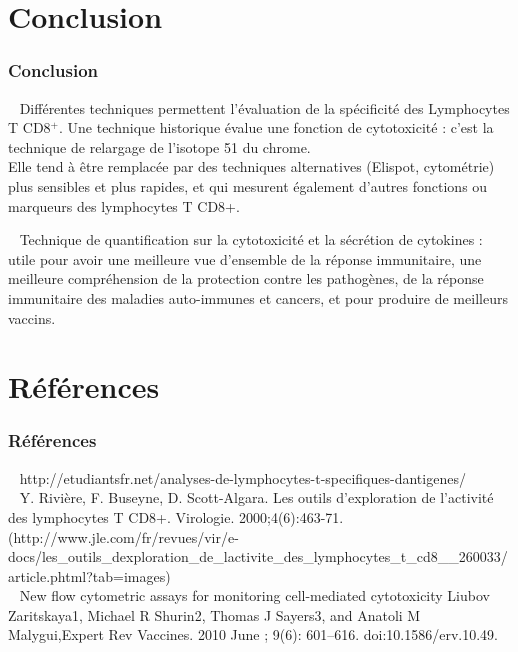 \documentclass[12pt]{beamer}
\begin{document}
\section{Conclusion}

\begin{frame}
  \transuncover
  \frametitle{Conclusion}

	\textbullet~ Différentes techniques permettent l'évaluation de la spécificité des Lymphocytes T CD8$^+$. Une technique historique évalue une fonction de cytotoxicité : c'est la technique de relargage de l’isotope 51 du chrome.\\
	Elle tend à être remplacée par des techniques alternatives (Elispot, cytométrie) plus sensibles et plus rapides, et qui mesurent également d'autres fonctions ou marqueurs des lymphocytes T CD8+.\\
	
	
	\vfill
	
	\textbullet~ Technique de quantification sur la cytotoxicité et la sécrétion de cytokines : utile pour avoir une meilleure vue d’ensemble de la réponse immunitaire, une meilleure compréhension de la protection contre les pathogènes, de la réponse immunitaire des maladies auto-immunes et cancers, et pour produire de meilleurs vaccins.
	
	
\end{frame}

\appendix

\section{Références}

\begin{frame}
  \transuncover
  \frametitle{Références}

  \textbullet~ http://etudiantsfr.net/analyses-de-lymphocytes-t-specifiques-dantigenes/\\
  \vfill
  \textbullet~ Y. Rivière, F. Buseyne, D. Scott-Algara. Les outils d’exploration de l’activité des lymphocytes T CD8+. Virologie. 2000;4(6):463-71. (http://www.jle.com/fr/revues/vir/e-docs/les\_outils\_dexploration\_de\_lactivite\_des\_lymphocytes\_t\_cd8\_\_260033/article.phtml?tab=images)\\
  \vfill
  \textbullet~ New flow cytometric assays for monitoring cell-mediated cytotoxicity Liubov Zaritskaya1, Michael R Shurin2, Thomas J Sayers3, and Anatoli M Malygui,Expert Rev Vaccines. 2010 June ; 9(6): 601–616. doi:10.1586/erv.10.49.
\end{frame}

	
\end{document}
